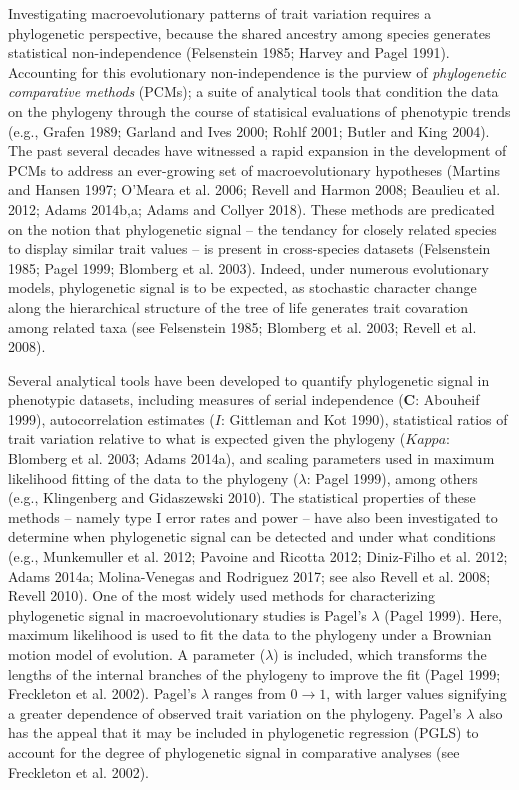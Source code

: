 \documentclass[
]{article}
\begin{document}
Investigating macroevolutionary patterns of trait variation requires a
phylogenetic perspective, because the shared ancestry among species
generates statistical non-independence (Felsenstein 1985; Harvey and
Pagel 1991). Accounting for this evolutionary non-independence is the
purview of \emph{phylogenetic comparative methods} (PCMs); a suite of
analytical tools that condition the data on the phylogeny through the
course of statisical evaluations of phenotypic trends (e.g., Grafen
1989; Garland and Ives 2000; Rohlf 2001; Butler and King 2004). The past
several decades have witnessed a rapid expansion in the development of
PCMs to address an ever-growing set of macroevolutionary hypotheses
(Martins and Hansen 1997; O'Meara et al. 2006; Revell and Harmon 2008;
Beaulieu et al. 2012; Adams 2014b,a; Adams and Collyer 2018). These
methods are predicated on the notion that phylogenetic signal -- the
tendancy for closely related species to display similar trait values --
is present in cross-species datasets (Felsenstein 1985; Pagel 1999;
Blomberg et al. 2003). Indeed, under numerous evolutionary models,
phylogenetic signal is to be expected, as stochastic character change
along the hierarchical structure of the tree of life generates trait
covaration among related taxa (see Felsenstein 1985; Blomberg et al.
2003; Revell et al. 2008). \hfill\break

Several analytical tools have been developed to quantify phylogenetic
signal in phenotypic datasets, including measures of serial independence
(\(\mathbf{C}\): Abouheif 1999), autocorrelation estimates (\(I\):
Gittleman and Kot 1990), statistical ratios of trait variation relative
to what is expected given the phylogeny (\(Kappa\): Blomberg et al.
2003; Adams 2014a), and scaling parameters used in maximum likelihood
fitting of the data to the phylogeny (\(\lambda\): Pagel 1999), among
others (e.g., Klingenberg and Gidaszewski 2010). The statistical
properties of these methods -- namely type I error rates and power --
have also been investigated to determine when phylogenetic signal can be
detected and under what conditions (e.g., Munkemuller et al. 2012;
Pavoine and Ricotta 2012; Diniz-Filho et al. 2012; Adams 2014a;
Molina-Venegas and Rodriguez 2017; see also Revell et al. 2008; Revell
2010). One of the most widely used methods for characterizing
phylogenetic signal in macroevolutionary studies is Pagel's \(\lambda\)
(Pagel 1999). Here, maximum likelihood is used to fit the data to the
phylogeny under a Brownian motion model of evolution. A parameter
(\(\lambda\)) is included, which transforms the lengths of the internal
branches of the phylogeny to improve the fit (Pagel 1999; Freckleton et
al. 2002). Pagel's \(\lambda\) ranges from \(0\to1\), with larger values
signifying a greater dependence of observed trait variation on the
phylogeny. Pagel's \(\lambda\) also has the appeal that it may be
included in phylogenetic regression (PGLS) to account for the degree of
phylogenetic signal in comparative analyses (see Freckleton et al.
2002). \hfill\break 
\end{document}
